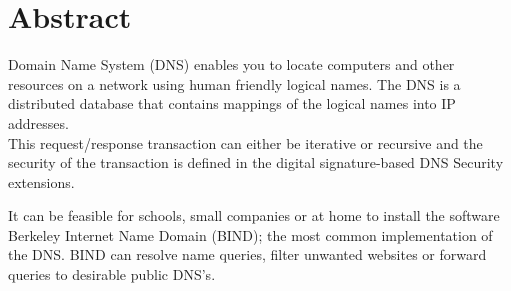\documentclass[Preamble]{subfiles}
\begin{document}
\chapter*{Abstract}

Domain Name System (DNS) enables you to locate computers and other resources on a network using human friendly logical names. The DNS is a distributed database that contains mappings of the logical names into IP addresses.\\This request/response transaction can either be iterative or recursive and the security of the transaction is defined in the digital signature-based DNS Security extensions.


It can be feasible for schools, small companies or at home to install the software Berkeley Internet Name Domain (BIND); the most common implementation of the DNS. BIND can resolve name queries, filter unwanted websites or forward queries to desirable public DNS's.


\setcounter{tocdepth}{1}
\tableofcontents
\end{document}
